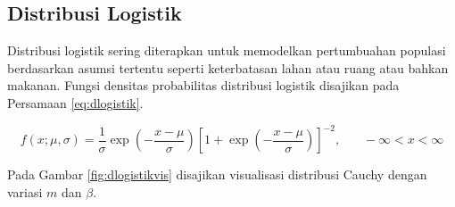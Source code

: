 \documentclass[]{book}
\begin{document}
\subsection{Distribusi Logistik}\label{distribusi-logistik}

Distribusi logistik sering diterapkan untuk memodelkan pertumbuahan
populasi berdasarkan asumsi tertentu seperti keterbatasan lahan atau
ruang atau bahkan makanan. Fungsi densitas probabilitas distribusi
logistik disajikan pada Persamaan \eqref{eq:dlogistik}.

\begin{equation}
   f\left(x;\mu,\sigma\right)=\frac{1}{\sigma}\exp\left(-\frac{x-\mu}{\sigma}\right)\left[1+\exp\left(-\frac{x-\mu}{\sigma}\right)\right]^{-2},\ \ \ \ \ \ \ \ -\infty<x<\infty
  \label{eq:dlogistik}
\end{equation}

Pada Gambar \ref{fig:dlogistikvis} disajikan visualisasi distribusi
Cauchy dengan variasi \(m\) dan \(\beta\).
\end{document}
